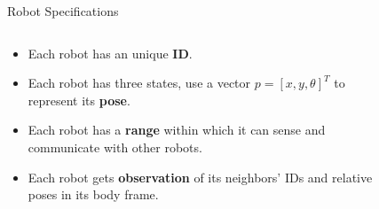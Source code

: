 \documentclass[10pt]{beamer}
\begin{document}


\begin{frame}{Robot Specifications}{}
\begin{block}{}
  \begin{columns}[T] %
      \begin{column}{.5\textwidth}
        \begin{itemize}
        \item Each robot has an unique \textbf{ID}.
        \item Each robot has three states, use a vector $p = [x, y,
          \theta]^T$ to represent its \textbf{pose}.
        \item Each robot has a \textbf{range} within which it can
          sense and communicate with other robots.
        \item Each robot gets \textbf{observation} of its neighbors'
          IDs and relative poses in its body frame.
        \end{itemize}
      \end{column}%
      \begin{column}{.4\textwidth}
        \begin{figure}
          \centering
\end{figure}
\end{column}
\end{columns}
\end{block}
\end{frame}
\end{document}
